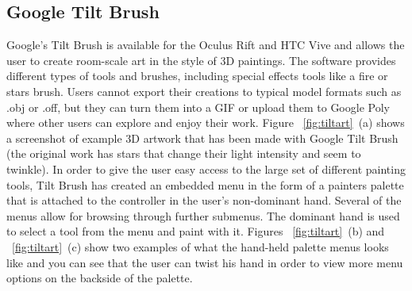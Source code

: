 \subsection{Google Tilt Brush}
Google's Tilt Brush is available for the Oculus Rift and HTC Vive and allows the user to  create room-scale art in the style of 3D paintings. The software provides different types of tools and brushes, including special effects tools like a fire or stars brush. Users cannot export their creations to typical model formats such as .obj or .off, but they can turn them into a GIF or upload them to Google Poly where other users can explore and enjoy their work.
Figure ~\ref{fig:tiltart}~(a) shows a screenshot of example 3D artwork that has been made with Google Tilt Brush (the original work has stars that change their light intensity and seem to twinkle). In order to give the user easy access to the large set of different painting tools, Tilt Brush has created an embedded menu in the form of a painters palette that is attached to the controller in the user's non-dominant hand. Several of the menus allow for browsing through further submenus. The dominant hand is used to select a tool from the menu and paint with it. Figures ~\ref{fig:tiltart}~(b) and ~\ref{fig:tiltart}~(c) show two examples of what the hand-held palette menus looks like and you can see that the user can twist his hand in order to view more menu options on the backside of the palette.


